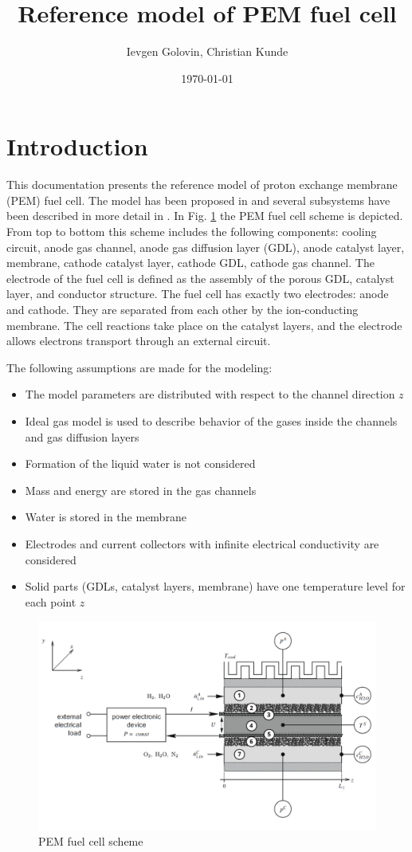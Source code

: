 \documentclass[pdftex,a4paper, 12pt]{article}
\date{\today}
\title{Reference model of PEM fuel cell }
\author{Ievgen Golovin, Christian Kunde}
\begin{document}
%
\maketitle
\tableofcontents
%
%
\section{Introduction}
\label{sec:intro}
%
This documentation presents the reference model of proton exchange membrane (PEM) fuel cell. The model has been proposed in \cite{Mangold2010} and several subsystems have been described in more detail in \cite{Bueck2008, Neubr1999}. In Fig. \ref{fig:scheme} the PEM fuel cell scheme is depicted. From top to bottom this scheme includes the following components: cooling circuit, anode gas channel, anode gas diffusion layer (GDL), anode catalyst layer, membrane, cathode catalyst layer, cathode GDL, cathode gas channel. The electrode of the fuel cell is defined as the assembly of the porous GDL, catalyst layer, and conductor structure. The fuel cell has exactly two electrodes: anode and cathode. They are separated from each other by the ion-conducting membrane. The cell reactions take place on the catalyst layers, and the electrode allows electrons transport through an external circuit.
%
\par
%
The following assumptions are made for the modeling:
%
\begin{itemize}
	\item The model parameters are distributed with respect to the channel direction $z$
	\item Ideal gas model is used to describe behavior of the gases inside the channels and gas diffusion layers
	\item Formation of the liquid water is not considered
	\item Mass and energy are stored in the gas channels
	\item Water is stored in the membrane
	\item Electrodes and current collectors with infinite electrical conductivity are considered
	\item Solid parts (GDLs, catalyst layers, membrane) have one temperature level for each point $z$
\end{itemize}
%
%
\begin{figure}[t]
	\centering
	\includegraphics[width=0.95\linewidth]{./figures/pem_fc_scheme.pdf}
	\caption{PEM fuel cell scheme \cite{Mangold2010}}
	\label{fig:scheme}
\end{figure}
\end{document}
